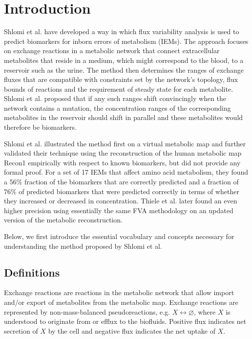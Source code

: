 \documentclass[10pt,a4paper,onecolumn]{article}
\begin{document}
\section{Introduction}\label{introduction}

Shlomi et al. \autocite{Shlomi2009} have developed a way in which flux
variability analysis \autocite{Mahadevan2003} is used to predict
biomarkers for inborn errors of metabolism (IEMs). The approach focuses
on exchange reactions in a metabolic network that connect extracellular
metabolites that reside in a medium, which might correspond to the
blood, to a reservoir such as the urine. The method then determines the
ranges of exchange fluxes that are compatible with constraints set by
the network's topology, flux bounds of reactions and the requirement of
steady state for each metabolite. Shlomi et al. proposed that if any
such ranges shift convincingly when the network contains a mutation, the
concentration ranges of the corresponding metabolites in the reservoir
should shift in parallel and these metabolites would therefore be
biomarkers.

Shlomi et al. illustrated the method first on a virtual metabolic map
and further validated their technique using the reconstruction of the
human metabolic map Recon1 \autocite{Duarte2007} empirically with
respect to known biomarkers, but did not provide any formal proof. For a
set of 17 IEMs that affect amino acid metabolism, they found a 56\%
fraction of the biomarkers that are correctly predicted and a fraction
of 76\% of predicted biomarkers that were predicted correctly in terms
of whether they increased or decreased in concentration. Thiele et al.
\autocite{Thiele2013} later found an even higher precision using
essentially the same FVA methodology on an updated version of the
metabolic reconstruction.

Below, we first introduce the essential vocabulary and concepts
necessary for understanding the method proposed by Shlomi et al.

\subsection{Definitions}\label{definitions}

Exchange reactions are reactions in the metabolic network that allow
import and/or export of metabolites from the metabolic map. Exchange
reactions are represented by non-mass-balanced pseudoreactions, e.g.
\(X \leftrightarrow \varnothing\), where \(X\) is understood to
originate from or efflux to the biofluids. Positive flux indicates net
secretion of \(X\) by the cell and negative flux indicates the net
uptake of \(X\).
\end{document}
